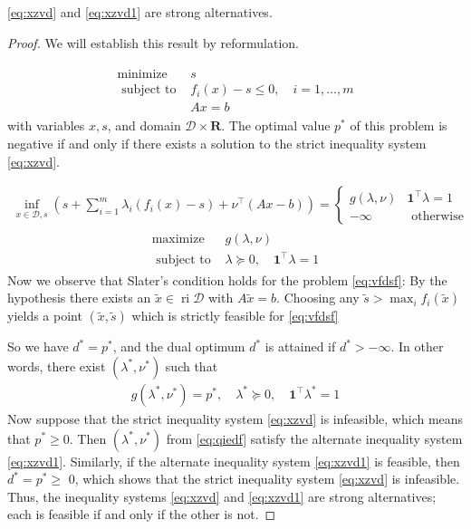 \documentclass{article}
\newcommand{\ri}{\operatorname{ri}}
\begin{document}
  \cref{eq:xzvd} and \cref{eq:xzvd1} are strong alternatives.
\begin{proof}\color{ForestGreen}We will establish this result by reformulation.

\begin{align}
\begin{array}{ll}
\operatorname{minimize} & s \\
\text { subject to } & f_{i}(x)-s \leq 0, \quad i=1, \ldots, m \\
& A x=b
\end{array}\label{eq:vfdsf}
\end{align}
with variables $x, s$, and domain $\mathcal{D} \times \mathbf{R}$. The optimal value $p^{* }$ of this problem is negative if and only if there exists a solution to the strict inequality system \cref{eq:xzvd}.

\begin{align*}
\inf _{x \in \mathcal{D}, s}\left(s+\sum_{i=1}^{m} \lambda_{i}\left(f_{i}(x)-s\right)+\nu^{\top}(A x-b)\right)= \begin{cases}g(\lambda, \nu) & \mathbf{1}^{\top} \lambda=1 \\ -\infty & \text { otherwise }\end{cases}
\end{align*}
\begin{align*}
\begin{array}{ll}
\operatorname{maximize} & g(\lambda, \nu) \\
\text { subject to } & \lambda \succeq 0, \quad \mathbf{1}^{\top} \lambda=1
\end{array}
\end{align*}
Now we observe that Slater's condition holds for the problem \cref{eq:vfdsf}: By the hypothesis there exists an $\tilde{x} \in \ri \mathcal{D}$ with $A \tilde{x}=b .$ Choosing any $\tilde{s}>\max _{i} f_{i}(\tilde{x})$ yields a point $(\tilde{x}, \tilde{s})$ which is strictly feasible for \cref{eq:vfdsf}

So we have $d^{* }=p^{* }$, and the dual optimum $d^{* }$ is attained if $d^*>-\infty$. In other words, there exist $\left(\lambda^{* }, \nu^{* }\right)$ such that
\begin{align}
g\left(\lambda^{* }, \nu^{* }\right)=p^{* }, \quad \lambda^{* } \succeq 0, \quad \mathbf{1}^{\top} \lambda^{* }=1\label{eq:qiedf}
\end{align}
Now suppose that the strict inequality system \cref{eq:xzvd} is infeasible, which means that $p^{* } \geq 0 .$ Then $\left(\lambda^{* }, \nu^{* }\right)$ from \cref{eq:qiedf} satisfy the alternate inequality system \cref{eq:xzvd1}. Similarly, if the alternate inequality system \cref{eq:xzvd1} is feasible, then $d^{* }=p^{* } \geq$ 0, which shows that the strict inequality system \cref{eq:xzvd} is infeasible. Thus, the inequality systems \cref{eq:xzvd} and \cref{eq:xzvd1} are strong alternatives; each is feasible if and only if the other is not.
\end{proof}
\end{document}
